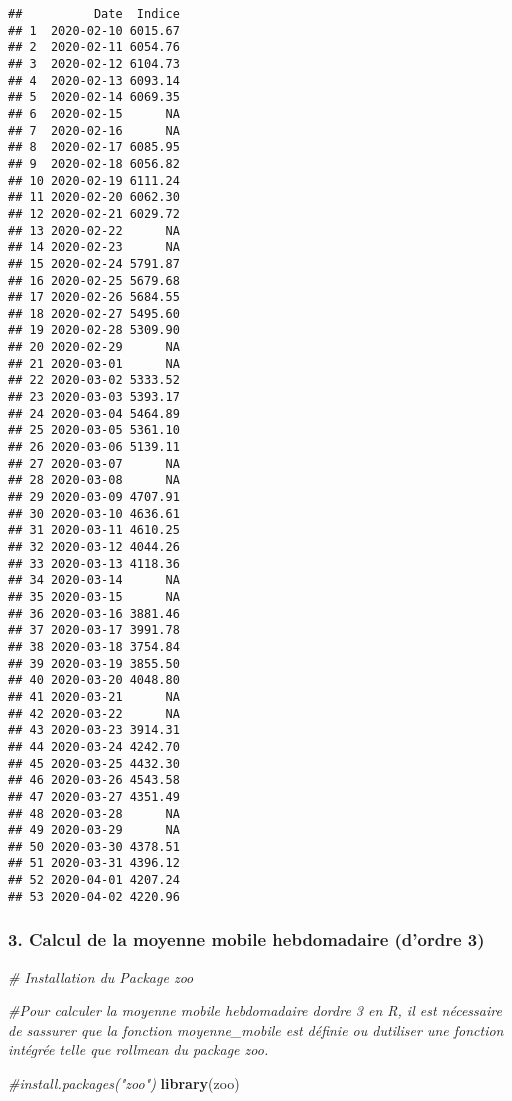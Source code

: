\documentclass[
]{article}
\newenvironment{Shaded}{\begin{snugshade}}{\end{snugshade}}
\newcommand{\CommentTok}[1]{\textcolor[rgb]{0.56,0.35,0.01}{\textit{#1}}}
\newcommand{\FunctionTok}[1]{\textcolor[rgb]{0.13,0.29,0.53}{\textbf{#1}}}
\newcommand{\NormalTok}[1]{#1}
\begin{document}
\begin{verbatim}
##          Date  Indice
## 1  2020-02-10 6015.67
## 2  2020-02-11 6054.76
## 3  2020-02-12 6104.73
## 4  2020-02-13 6093.14
## 5  2020-02-14 6069.35
## 6  2020-02-15      NA
## 7  2020-02-16      NA
## 8  2020-02-17 6085.95
## 9  2020-02-18 6056.82
## 10 2020-02-19 6111.24
## 11 2020-02-20 6062.30
## 12 2020-02-21 6029.72
## 13 2020-02-22      NA
## 14 2020-02-23      NA
## 15 2020-02-24 5791.87
## 16 2020-02-25 5679.68
## 17 2020-02-26 5684.55
## 18 2020-02-27 5495.60
## 19 2020-02-28 5309.90
## 20 2020-02-29      NA
## 21 2020-03-01      NA
## 22 2020-03-02 5333.52
## 23 2020-03-03 5393.17
## 24 2020-03-04 5464.89
## 25 2020-03-05 5361.10
## 26 2020-03-06 5139.11
## 27 2020-03-07      NA
## 28 2020-03-08      NA
## 29 2020-03-09 4707.91
## 30 2020-03-10 4636.61
## 31 2020-03-11 4610.25
## 32 2020-03-12 4044.26
## 33 2020-03-13 4118.36
## 34 2020-03-14      NA
## 35 2020-03-15      NA
## 36 2020-03-16 3881.46
## 37 2020-03-17 3991.78
## 38 2020-03-18 3754.84
## 39 2020-03-19 3855.50
## 40 2020-03-20 4048.80
## 41 2020-03-21      NA
## 42 2020-03-22      NA
## 43 2020-03-23 3914.31
## 44 2020-03-24 4242.70
## 45 2020-03-25 4432.30
## 46 2020-03-26 4543.58
## 47 2020-03-27 4351.49
## 48 2020-03-28      NA
## 49 2020-03-29      NA
## 50 2020-03-30 4378.51
## 51 2020-03-31 4396.12
## 52 2020-04-01 4207.24
## 53 2020-04-02 4220.96
\end{verbatim}

\subsubsection{3. Calcul de la moyenne mobile hebdomadaire (d'ordre
3)}\label{calcul-de-la-moyenne-mobile-hebdomadaire-dordre-3}

\begin{Shaded}
\begin{Highlighting}[]
\CommentTok{\# Installation du Package \textasciigrave{}zoo\textasciigrave{}}

\CommentTok{\#Pour calculer la moyenne mobile hebdomadaire d\textquotesingle{}ordre 3 en R, il est nécessaire de s\textquotesingle{}assurer que la fonction moyenne\_mobile est définie ou d\textquotesingle{}utiliser une fonction intégrée telle que \textasciigrave{}rollmean\textasciigrave{} du package zoo.}

\CommentTok{\#install.packages("zoo")}
\FunctionTok{library}\NormalTok{(zoo)}
\end{Highlighting}
\end{Shaded}
\end{document}
